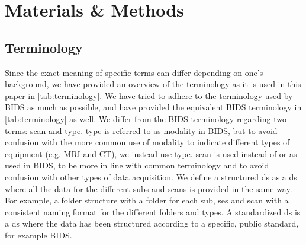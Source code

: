 \section{Materials \& Methods}
\subsection{Terminology}

Since the exact meaning of specific terms can differ depending on one's background, we have provided an overview of the terminology as it is used in this paper in \cref{tab:terminology}.
We have tried to adhere to the terminology used by \gls{BIDS} as much as possible, and have provided the equivalent \gls{BIDS} terminology in \cref{tab:terminology} as well.
We differ from the \gls{BIDS} terminology regarding two terms: \gls{scan} and \gls{type}.
\Gls{type} is referred to as modality in \gls{BIDS}, but to avoid confusion with the more common use of modality to indicate different types of equipment (e.g. \gls{MRI} and \gls{CT}), we instead use \gls{type}.
\Gls{scan} is used instead of  or  as used in \gls{BIDS}, to be more in line with common terminology and to avoid confusion with other types of data acquisition.
We define a structured \gls{ds} as a \gls{ds} where all the data for the different \glspl{sub} and \glspl{scan} is provided in the same way.
For example, a folder structure with a folder for each \gls{sub}, \gls{ses} and \gls{scan} with a consistent naming format for the different folders and \glspl{type}.
A standardized \gls{ds} is a \gls{ds} where the data has been structured according to a specific, public standard, for example \gls{BIDS}.



